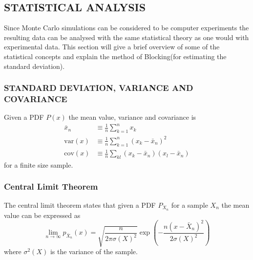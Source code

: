\documentclass[a4paper, hidelinks, 10pt]{article}\usepackage[utf8]{inputenc}
\let\oldsubsection\subsection
\renewcommand{\subsection}[1]{\centering \oldsubsection{{#1}} \justifying}
\newcommand{\rarr}{\rightarrow} %
\newcommand{\suml}[2]{\sum\limits_{#1=1}^{#2}}
\begin{document}
\subsection{STATISTICAL ANALYSIS}
\label{sub:statistical_analysis}
    Since Monte Carlo simulations can be considered to be computer experiments
    the resulting data can be analysed with the same statistical theory as one
    would with experimental data. This section will give a brief overview of
    some of the statistical concepts and explain the method of Blocking(for
    estimating the standard deviation).

\subsubsection{STANDARD DEVIATION, VARIANCE AND COVARIANCE}
\label{ssub:standard_deviation__variance_and_covariance}
    Given a PDF $P(x)$ the mean value, variance and covariance is
        \begin{align}
            \bar{x}_n &\equiv \frac{1}{n}\suml{k}{n} x_k \\
            \text{var}(x) &\equiv
            \frac{1}{n}\suml{k}{n}\left(x_k-\bar{x}_n\right)^2 \\
            \text{cov}(x) &\equiv \frac{1}{n}\sum\limits_{kl}
            \left(x_k-\bar{x}_n\right)\left(x_l-\bar{x}_n\right)
            \label{eq:statfinite}
        \end{align}
    for a finite size sample.

\subsubsection{Central Limit Theorem}
\label{ssub:central_limit_theorem}
    The central limit theorem states that given a PDF $P_{X_n}$ for a sample $X_n$
    the mean value can be expressed as
        \begin{equation}
            \lim\limits_{n\rarr\infty}p_{\bar{X}_n}(x) =
            \sqrt{\frac{n}{2\pi\sigma(X)^2}}
            \exp(-\frac{n(x-\bar{X}_n)^2}{2\sigma(X)^2})
            \label{eq:centrallimit}
        \end{equation}
    where $\sigma^2(X)$ is the variance of the sample.
\end{document}
